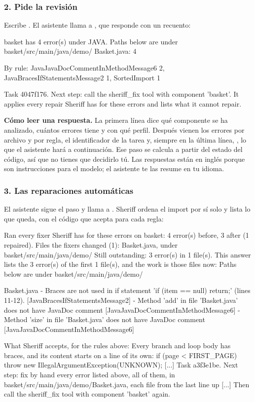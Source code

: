 \documentclass[11pt,a4paper]{article}
\begin{document}
\subsubsection{2. Pide la revisión}
Escribe . El asistente llama a
, que responde con un recuento:

\begin{answer}
basket has 4 error(s) under JAVA.
Paths below are under basket/src/main/java/demo/
  Basket.java: 4

By rule: JavaJavaDocCommentInMethodMessage6 2, JavaBracesIfStatementsMessage2 1, SortedImport 1

Task 4047f176.
Next step: call the sheriff_fix tool with component 'basket'. It applies every repair Sheriff has for these errors and lists what it cannot repair.
\end{answer}

\begin{note}
\textbf{Cómo leer una respuesta.} La primera línea dice qué componente se ha
analizado, cuántos errores tiene y con qué perfil. Después vienen los errores
por archivo y por regla, el identificador de la tarea y, siempre en la última
línea, \textbf{}, lo que el asistente hará a continuación. Ese
paso se calcula a partir del estado del código, así que no tienes que decidirlo
tú. Las respuestas están en inglés porque son instrucciones para el modelo; el
asistente te las resume en tu idioma.
\end{note}

\subsubsection{3. Las reparaciones automáticas}
El asistente sigue el paso y llama a . Sheriff ordena el
import por sí solo y lista lo que queda, con el código que acepta para cada
regla:

\begin{answer}
Ran every fixer Sheriff has for these errors on basket: 4 error(s) before, 3 after (1 repaired).
Files the fixers changed (1): Basket.java, under basket/src/main/java/demo/
Still outstanding: 3 error(s) in 1 file(s). This answer lists the 3 error(s) of the first 1 file(s), and the work is those files now:
Paths below are under basket/src/main/java/demo/

Basket.java
  - Braces are not used in if statement 'if (item == null) return;' (lines 11-12).  [JavaBracesIfStatementsMessage2]
  - Method 'add' in file 'Basket.java' does not have JavaDoc comment  [JavaJavaDocCommentInMethodMessage6]
  - Method 'size' in file 'Basket.java' does not have JavaDoc comment  [JavaJavaDocCommentInMethodMessage6]

What Sheriff accepts, for the rules above:
Every branch and loop body has braces, and its content starts on a line of its own:
    if (page < FIRST_PAGE) {
        throw new IllegalArgumentException(UNKNOWN);
    }
[...]
Task a3f3e1be.
Next step: fix by hand every error listed above, all of them, in basket/src/main/java/demo/Basket.java, each file from the last line up [...] Then call the sheriff_fix tool with component 'basket' again.
\end{answer}
\end{document}
